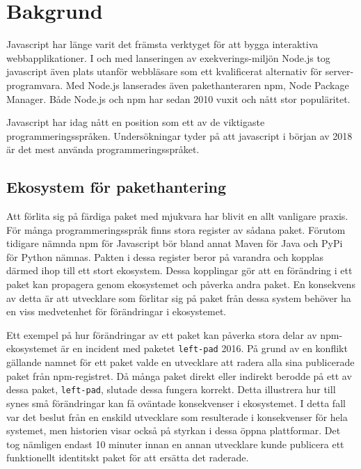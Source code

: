 \section{Bakgrund}
\label{sec:joel_o-background}


Javascript har länge varit det främsta verktyget för att bygga interaktiva webbapplikationer. I och med lanseringen av exekverings-miljön Node.js tog javascript även plats utanför webbläsare som ett kvalificerat alternativ för server-programvara. Med Node.js lanserades även pakethanteraren npm, Node Package Manager. Både Node.js och npm har sedan 2010 vuxit och nått stor populäritet. \cite{node-timeline}

Javascript har idag nått en position som ett av de viktigaste programmeringsspråken. Undersökningar tyder på att javascript i början av 2018 är det mest använda programmeringsspråket.\cite{githut}\cite{so-survey}

\subsection{Ekosystem för pakethantering}
Att förlita sig på färdiga paket med mjukvara har blivit en allt vanligare praxis. För många programmeringsspråk finns stora register av sådana paket. Förutom tidigare nämnda npm för Javascript bör bland annat Maven för Java och PyPi för Python nämnas. Pakten i dessa register beror på varandra och kopplas därmed ihop till ett stort ekosystem. Dessa kopplingar gör att en förändring i ett paket kan propagera genom ekosystemet och påverka andra paket. En konsekvens av detta är att utvecklare som förlitar sig på paket från dessa system behöver ha en viss medvetenhet för förändringar i ekosystemet.\cite{Henry2017}

Ett exempel på hur förändringar av ett paket kan påverka stora delar av npm-ekosystemet är en incident med paketet \texttt{left-pad} 2016. På grund av en konflikt gällande namnet för ett paket valde en utvecklare att radera alla sina publicerade paket från npm-registret. Då många paket direkt eller indirekt berodde på ett av dessa paket,  \texttt{left-pad}, slutade dessa fungera korrekt. Detta illustrera hur till synes små förändringar kan få oväntade konsekvenser i ekosystemet. I detta fall var det beslut från en enskild utvecklare som resulterade i konsekvenser för hela systemet, men historien visar också på styrkan i dessa öppna plattformar. Det tog nämligen endast 10 minuter innan en annan utvecklare kunde publicera ett funktionellt identitskt paket för att ersätta det raderade.\cite{npm-left-pad}

